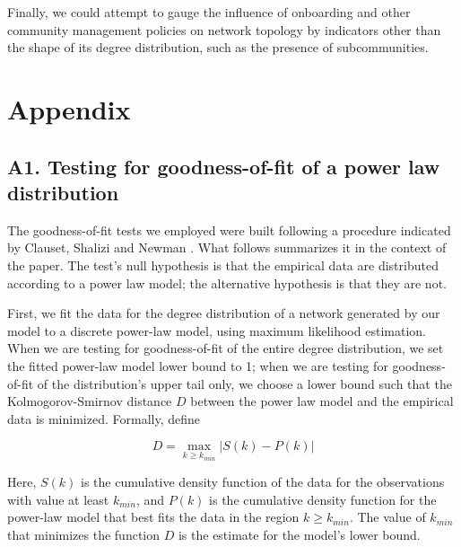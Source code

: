 \documentclass{bmcart}
\begin{document}
Finally, we could attempt to gauge the influence of onboarding and other community management policies on network topology by indicators other than the shape of its degree distribution, such as the presence of subcommunities. 


\section*{Appendix}
\subsection*{A1. Testing for goodness-of-fit of a power law distribution}

The goodness-of-fit tests we employed were built following a procedure indicated by Clauset, Shalizi and Newman \cite[pp. 15-18]{clauset2009power}. What follows summarizes it in the context of the paper. The test's null hypothesis is that the empirical data are distributed according to a power law model; the alternative hypothesis is that they are not.

First, we fit the data for the degree distribution of a network generated by our model to a discrete power-law model, using maximum likelihood estimation. When we are testing for goodness-of-fit of the entire degree distribution, we set the fitted power-law model lower bound to 1; when we are testing for goodness-of-fit of the distribution's upper tail only, we choose a lower bound  such that the Kolmogorov-Smirnov distance $D$ between the power law model and the empirical data is minimized. Formally, define

$$D = \max_{k \geq k_{min}} | S(k) - P(k) |$$

Here, $S(k)$ is the cumulative density function of the data for the observations with value at least $k_{min}$, and $P(k)$ is the cumulative density function for the power-law model that best fits the data in the region $k \geq k_{min}$. The value of $k_{min}$ that minimizes the function $D$ is the estimate for the model's lower bound.
\end{document}
